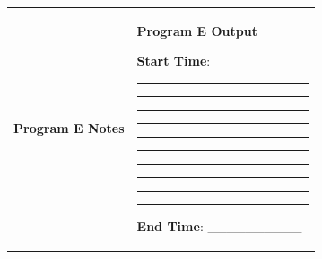 \documentclass[12pt, a4paper, oneside]{article}
\begin{document}
\begin{longtable}[]{@{}ll@{}}


\begin{minipage}[t]{0.5\columnwidth}\raggedright\strut
\textbf{Program E Notes}
\strut\end{minipage} &
\begin{minipage}[t]{0.5\columnwidth}\raggedright\strut
\textbf{Program E Output}

\vspace{20pt}

\textbf{Start Time}: \_\_\_\_\_\_\_\_\_\_

\vspace{10pt}

\begin{center}\vspace{6pt}\rule{\linewidth}{\linethickness}\end{center}
\begin{center}\vspace{6pt}\rule{\linewidth}{\linethickness}\end{center}
\begin{center}\vspace{6pt}\rule{\linewidth}{\linethickness}\end{center}
\begin{center}\vspace{6pt}\rule{\linewidth}{\linethickness}\end{center}
\begin{center}\vspace{6pt}\rule{\linewidth}{\linethickness}\end{center}
\begin{center}\vspace{6pt}\rule{\linewidth}{\linethickness}\end{center}
\begin{center}\vspace{6pt}\rule{\linewidth}{\linethickness}\end{center}
\begin{center}\vspace{6pt}\rule{\linewidth}{\linethickness}\end{center}
\begin{center}\vspace{6pt}\rule{\linewidth}{\linethickness}\end{center}
\begin{center}\vspace{6pt}\rule{\linewidth}{\linethickness}\end{center}

\vspace{20pt}

\textbf{End Time}: \_\_\_\_\_\_\_\_\_\_

\strut\end{minipage}\tabularnewline

\end{longtable}
\end{document}
